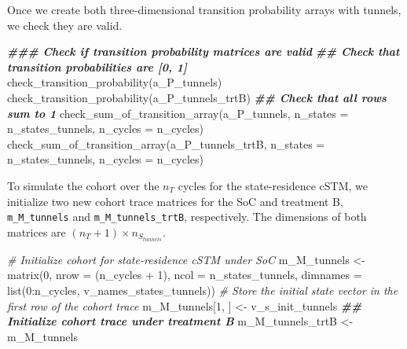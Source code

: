 \documentclass[
]{article}
\newenvironment{Shaded}{\begin{snugshade}}{\end{snugshade}}
\newcommand{\AttributeTok}[1]{\textcolor[rgb]{0.77,0.63,0.00}{#1}}
\newcommand{\CommentTok}[1]{\textcolor[rgb]{0.56,0.35,0.01}{\textit{#1}}}
\newcommand{\DecValTok}[1]{\textcolor[rgb]{0.00,0.00,0.81}{#1}}
\newcommand{\DocumentationTok}[1]{\textcolor[rgb]{0.56,0.35,0.01}{\textbf{\textit{#1}}}}
\newcommand{\FunctionTok}[1]{\textcolor[rgb]{0.00,0.00,0.00}{#1}}
\newcommand{\NormalTok}[1]{#1}
\newcommand{\OtherTok}[1]{\textcolor[rgb]{0.56,0.35,0.01}{#1}}
\newcommand{\SpecialCharTok}[1]{\textcolor[rgb]{0.00,0.00,0.00}{#1}}
\begin{document}
Once we create both three-dimensional transition probability arrays with tunnels, we check they are valid.

\begin{Shaded}
\begin{Highlighting}[]
\DocumentationTok{\#\#\# Check if transition probability matrices are valid}
\DocumentationTok{\#\# Check that transition probabilities are [0, 1]}
\FunctionTok{check\_transition\_probability}\NormalTok{(a\_P\_tunnels)}
\FunctionTok{check\_transition\_probability}\NormalTok{(a\_P\_tunnels\_trtB)}
\DocumentationTok{\#\# Check that all rows sum to 1}
\FunctionTok{check\_sum\_of\_transition\_array}\NormalTok{(a\_P\_tunnels,      }\AttributeTok{n\_states =}\NormalTok{ n\_states\_tunnels, }
                              \AttributeTok{n\_cycles =}\NormalTok{ n\_cycles)}
\FunctionTok{check\_sum\_of\_transition\_array}\NormalTok{(a\_P\_tunnels\_trtB, }\AttributeTok{n\_states =}\NormalTok{ n\_states\_tunnels, }
                              \AttributeTok{n\_cycles =}\NormalTok{ n\_cycles)}
\end{Highlighting}
\end{Shaded}

To simulate the cohort over the \(n_T\) cycles for the state-residence cSTM, we initialize two new cohort trace matrices for the SoC and treatment B, \texttt{m\_M\_tunnels} and \texttt{m\_M\_tunnels\_trtB}, respectively. The dimensions of both matrices are \((n_T+1) \times n_{S_{tunnels}}\).

\begin{Shaded}
\begin{Highlighting}[]
\CommentTok{\# Initialize cohort for state{-}residence cSTM under SoC}
\NormalTok{m\_M\_tunnels }\OtherTok{\textless{}{-}} \FunctionTok{matrix}\NormalTok{(}\DecValTok{0}\NormalTok{, }
                      \AttributeTok{nrow =}\NormalTok{ (n\_cycles }\SpecialCharTok{+} \DecValTok{1}\NormalTok{), }\AttributeTok{ncol =}\NormalTok{ n\_states\_tunnels, }
                      \AttributeTok{dimnames =} \FunctionTok{list}\NormalTok{(}\DecValTok{0}\SpecialCharTok{:}\NormalTok{n\_cycles, v\_names\_states\_tunnels))}
\CommentTok{\# Store the initial state vector in the first row of the cohort trace}
\NormalTok{m\_M\_tunnels[}\DecValTok{1}\NormalTok{, ] }\OtherTok{\textless{}{-}}\NormalTok{ v\_s\_init\_tunnels}
\DocumentationTok{\#\# Initialize cohort trace under treatment B}
\NormalTok{m\_M\_tunnels\_trtB }\OtherTok{\textless{}{-}}\NormalTok{ m\_M\_tunnels}
\end{Highlighting}
\end{Shaded}
\end{document}

